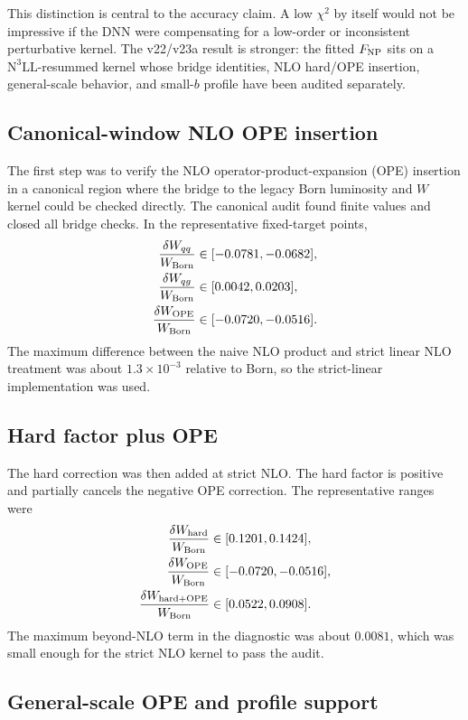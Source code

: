 \documentclass[11pt]{article}
\newcommand{\FNP}{F_{\rm NP}}
\newcommand{\chisq}{\chi^2}
\newcommand{\NthreeLL}{\mathrm{N^{3}LL}}
\begin{document}
This distinction is central to the accuracy claim.  A low $\chisq$ by itself would not be impressive if the DNN were compensating for a low-order or inconsistent perturbative kernel.  The v22/v23a result is stronger: the fitted $\FNP$ sits on a $\NthreeLL$-resummed kernel whose bridge identities, NLO hard/OPE insertion, general-scale behavior, and small-$b$ profile have been audited separately.

\subsection{Canonical-window NLO OPE insertion}

The first step was to verify the NLO operator-product-expansion (OPE) insertion in a canonical region where the bridge to the legacy Born luminosity and $W$ kernel could be checked directly.  The canonical audit found finite values and closed all bridge checks.  In the representative fixed-target points,
\begin{align}
  \frac{\delta W_{qq}}{W_{\rm Born}} &\in [-0.0781,-0.0682],\\
  \frac{\delta W_{qg}}{W_{\rm Born}} &\in [0.0042,0.0203],\\
  \frac{\delta W_{\rm OPE}}{W_{\rm Born}} &\in [-0.0720,-0.0516].
\end{align}
The maximum difference between the naive NLO product and strict linear NLO treatment was about $1.3\times10^{-3}$ relative to Born, so the strict-linear implementation was used.

\subsection{Hard factor plus OPE}

The hard correction was then added at strict NLO.  The hard factor is positive and partially cancels the negative OPE correction.  The representative ranges were
\begin{align}
  \frac{\delta W_{\rm hard}}{W_{\rm Born}} &\in [0.1201,0.1424],\\
  \frac{\delta W_{\rm OPE}}{W_{\rm Born}} &\in [-0.0720,-0.0516],\\
  \frac{\delta W_{\rm hard+OPE}}{W_{\rm Born}} &\in [0.0522,0.0908].
\end{align}
The maximum beyond-NLO term in the diagnostic was about $0.0081$, which was small enough for the strict NLO kernel to pass the audit.

\subsection{General-scale OPE and profile support}
\end{document}
